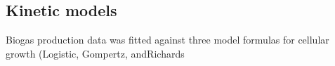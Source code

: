 \subsection{Kinetic models}
Biogas production data was fitted against three model formulas for cellular growth (Logistic, Gompertz, andRichards